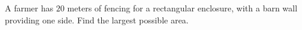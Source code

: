 A farmer has $20$ meters of fencing for a rectangular enclosure, with a barn wall providing one side. Find the largest possible area.
